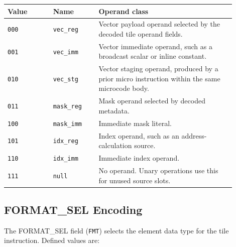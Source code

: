 \begin{longtable}{@{}L{0.18\linewidth}L{0.18\linewidth}L{0.54\linewidth}@{}}
\toprule
Value & Name & Operand class \\
\midrule
\texttt{000} & \texttt{vec\_reg} & Vector payload operand selected by the decoded tile operand fields. \\
\texttt{001} & \texttt{vec\_imm} & Vector immediate operand, such as a broadcast scalar or inline constant. \\
\texttt{010} & \texttt{vec\_stg} & Vector staging operand, produced by a prior micro instruction within the same microcode body. \\
\texttt{011} & \texttt{mask\_reg} & Mask operand selected by decoded metadata. \\
\texttt{100} & \texttt{mask\_imm} & Immediate mask literal. \\
\texttt{101} & \texttt{idx\_reg} & Index operand, such as an address-calculation source. \\
\texttt{110} & \texttt{idx\_imm} & Immediate index operand. \\
\texttt{111} & \texttt{null} & No operand. Unary operations use this for unused source slots. \\
\bottomrule
\end{longtable}

\subsection{FORMAT\_SEL Encoding}
\label{tab:format_sel}
The FORMAT\_SEL field (\texttt{FMT}) selects the element data type for the tile instruction. Defined values are:

